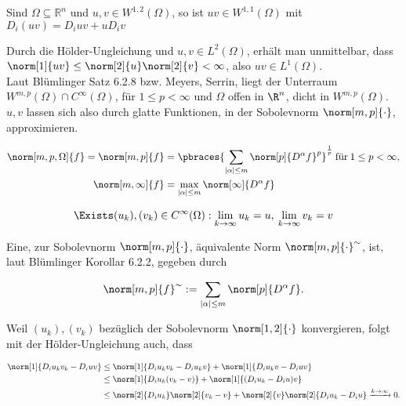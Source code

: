 \begin{exercise}

Sind $\Omega\subseteq\mathbb{R}^n$ und $u,v \in W^{1,2}(\Omega)$, so ist $uv \in W^{1,1}(\Omega)$ mit $D_i(uv) = D_iuv + uD_iv$

\end{exercise}

\begin{solution}

Durch die Hölder-Ungleichung und $u, v \in L^2(\Omega)$, erhält man unmittelbar, dass $\norm[1]{uv} \leq \norm[2]{u} \norm[2]{v} < \infty$, also $uv \in L^1(\Omega)$. \\

Laut Blümlinger Satz 6.2.8 bzw. Meyers, Serrin, liegt der Unterraum $W^{m, p}(\Omega) \cap C^\infty(\Omega)$, für $1 \leq p < \infty$ und $\Omega$ offen in $\R^n$, dicht in $W^{m, p}(\Omega)$. $u, v$ lassen sich also durch glatte Funktionen, in der Sobolevnorm $\norm[m, p]{\cdot}$, approximieren.

\begin{align*}
  \norm[m, p, \Omega]{f} =
  \norm[m, p]{f} & =
  \pbraces
  {
    \sum_{|\alpha| \leq m}
    \norm[p]{D^\alpha f}^p
  }^\frac{1}{p} \:
  \text{für} \:
  1 \leq p < \infty, \\
  \norm[m, \infty]{f} & =
  \max_{|\alpha| \leq m}
  \norm[\infty]{D^\alpha f}
\end{align*}

\begin{align*}
  \Exists (u_k), (v_k) \in C^\infty(\Omega):
  \lim_{k \to \infty} u_k = u, \:
  \lim_{k \to \infty} v_k = v
\end{align*}

Eine, zur Sobolevnorm $\norm[m, p]{\cdot}$, äquivalente Norm $\norm[m, p]{\cdot}^\sim$, ist, laut Blümlinger Korollar 6.2.2, gegeben durch

\begin{align*}
  \norm[m, p]{f}^\sim :=
  \sum_{|\alpha| \leq m}
  \norm[p]{D^\alpha f}.
\end{align*}

Weil $(u_k), (v_k)$ bezüglich der Sobolevnorm $\norm[1, 2]{\cdot}$ konvergieren, folgt mit der Hölder-Ungleichung auch, dass

\begin{align*}
  \norm[1]{D_i u_k v_k - D_i uv}
  & \leq \norm[1]{D_i u_k v_k - D_i u_k v} +
        \norm[1]{D_i u_k v - D_i uv} \\
  & \leq \norm[1]{D_i u_k (v_k - v)} +
         \norm[1]{(D_i u_k - D_i u) v} \\
  & \leq \norm[2]{D_i u_k}
         \norm[2]{v_k - v} +
         \norm[2]{v}
         \norm[2]{D_i u_k - D_i u}
         \xrightarrow{k \to \infty} 0.
\end{align*}


\end{solution}
